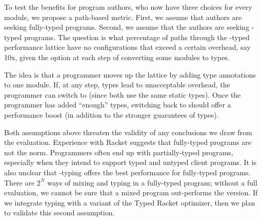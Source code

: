 To test the benefits for program authors, who now have three choices for every
module, we propose a path-based metric.
First, we assume that authors are seeking fully-typed programs.
Second, we assume that the authors are seeking \tdeep{}-typed programs.
The question is what percentage of paths through the \tdeep{}-typed performance
lattice have no configurations that exceed a certain overhead, say 10x, given
the option at each step of converting some modules to \tshallow{} types.

The idea is that a programmer moves up the lattice by adding type annotations
to one module.
If, at any step, \tdeep{} types lead to unacceptable overhead, the programmer can
switch to \tshallow{} (since both use the same static types).
Once the programmer has added ``enough'' types, switching back to \tdeep{} should
offer a performance boost (in addition to the stronger guarantees of \tdeep{} types).

Both assumptions above threaten the validity of any conclusions we draw from the
evaluation.
Experience with Racket suggests that fully-typed programs are not the norm.
Programmers often end up with partially-typed programs, especially when they
intend to support typed and untyped client programs.
It is also unclear that \tdeep{}-typing offers the best performance for fully-typed
programs.
There are $2^N$ ways of mixing \tdeep{} and \tshallow{} typing in a fully-typed program;
 without a full evaluation, we cannot be sure that a mixed program out-performs
 the \tdeep{} version.
If we integrate \tshallow{} typing with a variant of the Typed Racket optimizer,
then we plan to validate this second assumption.

